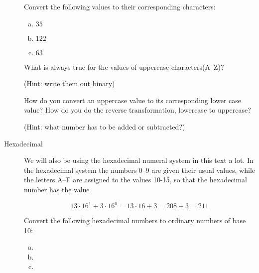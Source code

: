 \begin{description}
  \begin{Exercise}[label={num-to-ascii}]
    Convert the following \ascii values to their corresponding characters:
    \begin{enumerate}[(a)]
    \item $35$
    \item $122$
    \item $63$
    \end{enumerate}
  \end{Exercise}

  \begin{Exercise}[label={ascii-uppercase}]

    What is always true for the \ascii values of uppercase characters(A--Z)?

    (Hint: write them out binary)

  \end{Exercise}

  \begin{Exercise}[label={uppercase-conv}]

    How do you convert an uppercase \ascii value to its corresponding
    lower case value? How do you do the reverse transformation,
    lowercase to uppercase?

    (Hint: what number has to be added or subtracted?)

  \end{Exercise}

\item[Hexadecimal] We will also be using the hexadecimal numeral system
  in this text a lot. In the hexadecimal system the numbers 0--9 are
  given their usual values, while the letters A--F are assigned to the
  values 10-15, so that the hexadecimal number  has the value

  \begin{equation*}
   13 \cdot 16^1 + 3 \cdot 16^0 = 13 \cdot 16 + 3 = 208 + 3 = 211
  \end{equation*}

  \begin{Exercise}[label={hex-to-n}]
    Convert the following hexadecimal numbers to ordinary numbers of
    base 10:

    \begin{enumerate}[(a)]
    \item {}
    \item {}
    \item {}
    \end{enumerate}


\end{Exercise}
\end{description}
